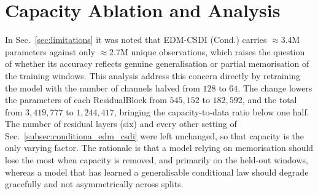 \section{Capacity Ablation and Analysis}
\label{app:sec:capacity_ablation}

In Sec.~\ref{sec:limitations} it was noted that EDM-CSDI (Cond.) carries \(\approx3.4\)M parameters against only \(\approx2.7\)M unique observations, which raises the question of whether its accuracy reflects genuine generalisation or partial memorisation of the training windows. This analysis address this concern directly by retraining the model with the number of channels halved from \(128\) to \(64\). The change lowers the parameters of each ResidualBlock from \(545{,}152\) to \(182{,}592\), and the total from \(3{,}419{,}777\) to \(1{,}244{,}417\), bringing the capacity-to-data ratio below one half. The number of residual layers (six) and every other setting of Sec.~\ref{subsec:conditiona_edm_csdi} were left unchanged, so that capacity is the only varying factor. The rationale is that a model relying on memorisation should lose the most when capacity is removed, and primarily on the held-out windows, whereas a model that has learned a generalisable conditional law should degrade gracefully and not asymmetrically across splits.

